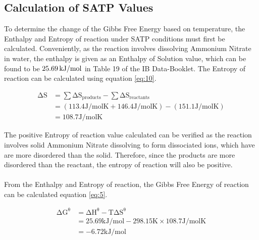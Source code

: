 \documentclass{article}
\begin{document}
\subsection{Calculation of SATP Values}
To determine the change of the Gibbs Free Energy based on temperature, the Enthalpy and Entropy of reaction under SATP conditions must first be calculated. Conveniently, as the reaction involves dissolving Ammonium Nitrate in water, the enthalpy is given as an Enthalpy of Solution value, which can be found to be $\ce{25.69 kJ/mol}$ in Table 19 of the IB Data-Booklet. The Entropy of reaction can be calculated using equation \ref{eq:10}.
\begin{tcolorbox}[title=Calculation of Entropy of Reaction under SATP Conditions ($\Delta S^{\theta}$)]
\begin{equation}
    \begin{split}
        \mathrm{\Delta S} &= \sum{\mathrm{\Delta S_{products}}} - \sum{\mathrm{\Delta S_{reactants}}} \\
        &= \mathrm{(113.4 J/mol K + 146.4 J/mol K) - (151.1 J/mol K)} \\
        &= \mathrm{108.7 J/mol K}
    \end{split}
\end{equation}
\end{tcolorbox}
\noindent
The positive Entropy of reaction value calculated can be verified as the reaction involves solid Ammonium Nitrate dissolving to form dissociated ions, which have are more disordered than the solid. Therefore, since the products are more disordered than the reactant, the entropy of reaction will also be positive. \\ \\

From the Enthalpy and Entropy of reaction, the Gibbs Free Energy of reaction can be calculated equation \ref{eq:5}.
\begin{tcolorbox}[title=Calculation of the Gibbs Free Energy under SATP Conditions ($\Delta G^{\theta}$)]
\begin{equation}
    \begin{split}
        \mathrm{\Delta G^{\theta}} &= \mathrm{\Delta H^{\theta}} - \mathrm{T \Delta S^{\theta}} \\
        &= 25.69 \mathrm{kJ/mol} - 298.15\mathrm{K} \times 108.7 \mathrm{J/mol K} \\
        &= -6.72 \mathrm{kJ/mol}
    \end{split}
\end{equation}
\end{tcolorbox}
\end{document}
